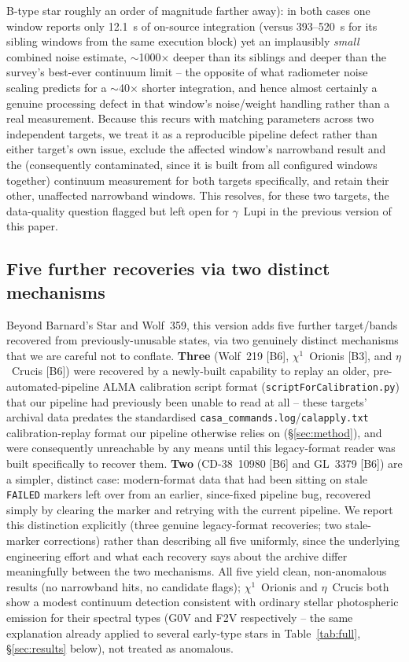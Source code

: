 \documentclass{openjournal}
\begin{document}
B-type star roughly an order of magnitude farther away): in both cases one window reports only 12.1~s of on-source
integration (versus 393--520~s for its sibling windows from the same
execution block) yet an implausibly \emph{small} combined noise estimate,
$\sim$1000$\times$ deeper than its siblings and deeper than the survey's
best-ever continuum limit -- the opposite of what radiometer noise
scaling predicts for a $\sim$40$\times$ shorter integration, and hence
almost certainly a genuine processing defect in that window's
noise/weight handling rather than a real measurement. Because this
recurs with matching parameters across two independent targets, we treat
it as a reproducible pipeline defect rather than either target's own
issue, exclude the affected window's narrowband result and the
(consequently contaminated, since it is built from all configured
windows together) continuum measurement for both targets specifically,
and retain their other, unaffected narrowband windows. This resolves, for
these two targets, the data-quality question flagged but left open for
$\gamma$~Lupi in the previous version of this paper.

\subsection{Five further recoveries via two distinct mechanisms}
\label{sec:fiverecoveries}

Beyond Barnard's Star and Wolf~359, this version adds five further
target/bands recovered from previously-unusable states, via two
genuinely distinct mechanisms that we are careful not to conflate.
\textbf{Three} (Wolf~219 [B6], $\chi^{1}$~Orionis [B3], and
$\eta$~Crucis [B6]) were recovered by a newly-built capability to replay
an older, pre-automated-pipeline ALMA calibration script format
(\texttt{scriptForCalibration.py}) that our pipeline had previously been
unable to read at all -- these targets' archival data predates the
standardised \texttt{casa\_commands.log}/\texttt{calapply.txt}
calibration-replay format our pipeline otherwise relies on
(\S\ref{sec:method}), and were consequently unreachable by any means
until this legacy-format reader was built specifically to recover them.
\textbf{Two} (CD-38~10980 [B6] and GL~3379 [B6]) are a simpler, distinct
case: modern-format data that had been sitting on stale
\texttt{FAILED} markers left over from an earlier, since-fixed pipeline
bug, recovered simply by clearing the marker and retrying with the
current pipeline. We report this distinction explicitly (three genuine
legacy-format recoveries; two stale-marker corrections) rather than
describing all five uniformly, since the underlying engineering effort
and what each recovery says about the archive differ meaningfully
between the two mechanisms. All five yield clean, non-anomalous results
(no narrowband hits, no candidate flags); $\chi^{1}$~Orionis and
$\eta$~Crucis both show a modest continuum detection consistent with
ordinary stellar photospheric emission for their spectral types (G0V and
F2V respectively -- the same explanation already applied to several
early-type stars in Table~\ref{tab:full}, \S\ref{sec:results} below),
not treated as anomalous.
\end{document}
